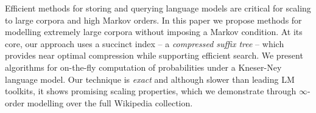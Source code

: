 Efficient methods for storing and querying language models are critical for scaling to large corpora and high Markov orders.
In this paper we propose methods for modelling extremely large corpora without
imposing a Markov condition.
At its core, our approach uses a succinct index -- a \emph{compressed suffix tree} -- which provides near optimal compression while supporting efficient search.
We present algorithms for on-the-fly computation of probabilities under a
Kneser-Ney language model.
Our technique is \emph{exact} and although slower than leading LM
toolkits, it shows promising scaling properties,
which we demonstrate  through $\infty$-order modelling over the full Wikipedia collection. 


